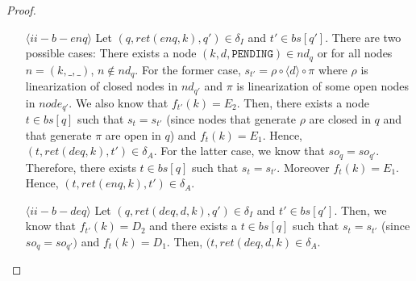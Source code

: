 \begin{proof}
\begin{itemize}
\item[$\langle ii-b-enq \rangle$] Let $(q,ret(enq,k),q') \in \delta_I$ and $t' \in bs[q']$. There are two possible cases: There exists a node $(k,d,\texttt{PENDING}) \in nd_q$ or for all nodes $n = (k,\_,\_)$, $n \notin nd_q$. For the former case, $s_{t'} = \rho \circ \langle d \rangle \circ \pi$ where $\rho$ is linearization of closed nodes in $nd_{q'}$ and $\pi$ is linearization of some open nodes in $node_{q'}$. We also know that $f_{t'}(k) = E_2$. Then, there exists a node $t \in bs[q]$ such that $s_t = s_{t'}$ (since nodes that generate $\rho$ are closed in $q$ and that generate $\pi$ are open in $q$) and $f_t(k) = E_1$. Hence, $(t,ret(deq,k),t') \in \delta_A$. For the latter case, we know that $so_q = so_{q'}$. Therefore, there exists $t \in bs[q]$ such that $s_t = s_{t'}$. Moreover $f_t(k) = E_1$. Hence, $(t,ret(enq,k),t') \in \delta_A$.
\item[$\langle ii-b-deq \rangle$] Let $(q,ret(deq,d,k), q') \in \delta_I$ and $t' \in bs[q']$. Then, we know that $f_{t'}(k) = D_2$ and there exists a $t \in bs[q]$ such that $s_t = s_{t'}$ (since $so_q = so_{q'})$ and $f_t(k) = D_1$. Then, $(t,ret(deq,d,k) \in \delta_A$.
\end{itemize}
\end{proof}

